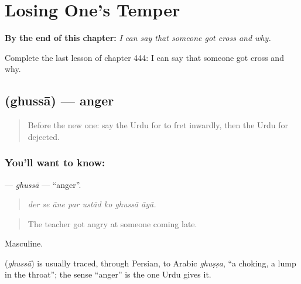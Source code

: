 
\chapter{Losing One's Temper}
\label{ch:ur-losing-one-s-temper}

\begin{chapteropening}
\textbf{By the end of this chapter:} \emph{I can say that someone got cross and why.}

Complete the last lesson of chapter 444: I can say that someone got cross and why.
\end{chapteropening}

\section[\texorpdfstring{\ur{غصہ} (ghussā)}{غصہ (ghussā)}]{ (ghussā) — anger}

\label{lesson:UR-C444-ghussa}



\begin{quote}
Before the new one: say the Urdu for to fret inwardly, then the Urdu for dejected.
\end{quote}

\subsection*{You'll want to know: }
\textbf{} — \emph{ghussā} — \textquotedblleft{}anger\textquotedblright{}.

\begin{quote}
       
\end{quote}

\begin{quote}
\emph{der se āne par ustād ko ghussā āyā.}
\end{quote}

\begin{quote}
The teacher got angry at someone coming late.
\end{quote}

Masculine.

\begin{cousinweb}
\textbf{} (\emph{ghussā}) is usually traced, through Persian, to Arabic \emph{ghuṣṣa}, \textquotedblleft{}a choking, a lump in the throat\textquotedblright{}; the sense \textquotedblleft{}anger\textquotedblright{} is the one Urdu gives it.
\end{cousinweb}


